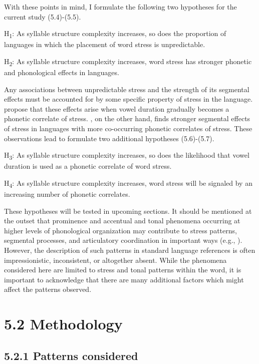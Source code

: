   With these points in mind, I formulate the following two hypotheses for the current study (5.4)-(5.5).

\ea\label{ex:(5.4)}
  H\textsubscript{1}: As syllable structure complexity increases, so does the proportion of languages in which the placement of word stress is unpredictable.

\ea\label{ex:(5.5)}
\z
  H\textsubscript{2}: As syllable structure complexity increases, word stress has stronger phonetic and phonological effects in languages.

\z

  Any associations between unpredictable stress and the strength of its segmental effects must be accounted for by some specific property of stress in the language. \citet{BybeeEtAl1998} propose that these effects arise when vowel duration gradually becomes a phonetic correlate of stress. \citet{Schiering2007}, on the other hand, finds stronger segmental effects of stress in languages with more co-occurring phonetic correlates of stress. These observations lead to formulate two additional hypotheses (5.6)-(5.7).

\ea\label{ex:(5.6)}
  H\textsubscript{3}: As syllable structure complexity increases, so does the likelihood that vowel duration is used as a phonetic correlate of word stress.

\z

\ea\label{ex:(5.7)}
  H\textsubscript{4}: As syllable structure complexity increases, word stress will be signaled by an increasing number of phonetic correlates.
\z

  These hypotheses will be tested in upcoming sections. It should be mentioned at the outset that prominence and accentual and tonal phenomena occurring at higher levels of phonological organization may contribute to stress patterns, segmental processes, and articulatory coordination in important ways (e.g., \citealt{FougeronKeating1997}). However, the description of such patterns in standard language references is often impressionistic, inconsistent, or altogether absent. While the phenomena considered here are limited to stress and tonal patterns within the word, it is important to acknowledge that there are many additional factors which might affect the patterns observed.

\section{5.2 Methodology}
\subsection{5.2.1 Patterns considered}

